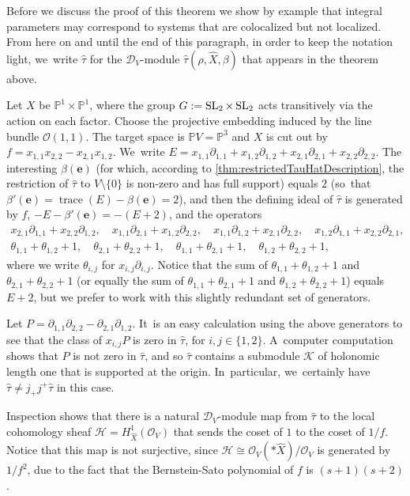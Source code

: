 \documentclass[JEP,XML,SOM,Unicode,published]{cedram}
\let\mathds\mathbb
\newcommand{\bme}{{\boldsymbol{e}}}
\newcommand{\dP}{{\mathds P}}\let\P\dP
\newcommand{\cD}{\mathscr{D}}
\newcommand{\cH}{\mathcal{H}}
\newcommand{\cK}{\mathcal{K}}
\newcommand{\cO}{\mathcal{O}}\let\O\cO
\DeclareMathOperator{\SL}{\textup{SL}}
\DeclareMathOperator{\trace}{trace}
\begin{document}
Before we discuss the proof of this theorem we show by example that integral parameters may correspond to systems that are colocalized but not localized. From here on and until the end of this paragraph, in order to keep the notation light, we~write $\hat\tau$ for the $\cD_V$\nobreakdash-mod\-ule
$\hat{\tau}(\rho, \hat{X}, \beta)$ that appears in the theorem above.

\begin{exa}\label{ex:Coloc}
Let $X$ be $\dP^1\times \dP^1$, where the group $G:=\SL_2\times\SL_2$ acts transitively via the action on each factor. Choose the projective embedding induced by the line bundle $\cO(1,1)$. The target space is $\dP V=\dP^3$ and $X$ is cut out by $f=x_{1,1}x_{2,2}-x_{2,1}x_{1,2}$. We~write
$E=x_{1,1}\partial_{1,1}+x_{1,2}\partial_{1,2}+
x_{2,1}\partial_{2,1}+x_{2,2}\partial_{2,2}$.
The interesting $\beta(\bme)$ (for which, according to \cref{thm:restrictedTauHatDescription}, the restriction of $\hat\tau$ to $V\setminus\{0\}$ is non-zero and has full support) equals $2$
(so~that $\beta'(\bme)=\trace(E)-\beta(\bme)=2$), and then the defining ideal of $\hat \tau$ is generated by $f$, $-E-\beta'(\bme)=-(E+2)$, and the operators
\begin{gather*}
x_{2,1}\partial_{1,1}+x_{2,2}\partial_{1,2},\quad x_{1,1}\partial_{2,1}+x_{1,2}\partial_{2,2},\quad x_{1,1}\partial_{1,2}+x_{2,1}\partial_{2,2},\quad x_{1,2}\partial_{1,1}+x_{2,2}\partial_{2,1},\\
\theta_{1,1}+\theta_{1,2}+1,\quad
\theta_{2,1}+\theta_{2,2}+1,\quad
\theta_{1,1}+\theta_{2,1}+1,\quad
\theta_{1,2}+\theta_{2,2}+1,
\end{gather*}
where we write $\theta_{i,j}$ for $x_{i,j}\partial_{i,j}$. Notice that the sum of $\theta_{1,1}+\theta_{1,2}+1$ and $\theta_{2,1}+\theta_{2,2}+1$ (or equally the sum of $\theta_{1,1}+\theta_{2,1}+1$ and $\theta_{1,2}+\theta_{2,2}+1$) equals $E+2$, but we prefer to work with this slightly redundant set of generators.

Let $P=\partial_{1,1}\partial_{2,2}-\partial_{2,1}\partial_{1,2}$. It~is an easy calculation using the above generators to see that the class of $x_{i,j}P$ is zero in $\hat\tau$, for $i,j\in\{1,2\}$. A~computer computation shows that $P$ is not zero in $\hat\tau$, and so $\hat\tau$ contains a submodule $\cK$ of holonomic length one that is supported at the origin. In~particular, we~certainly have $\hat{\tau}\neq j_+j^+\hat{\tau}$ in this case.

Inspection shows that there is a natural $\cD_V$\nobreakdash-mod\-ule map from $\hat\tau$ to the local cohomology sheaf $\cH=H^1_{\hat X}(\cO_V)$ that sends the coset of $1$ to the coset of $1/f$. Notice that this map is not surjective, since $\cH \cong \cO_V(*\hat{X})/\cO_V$ is generated by $1/f^2$, due to the fact that the Bernstein-Sato polynomial of $f$ is $(s+1)(s+2)$.


\end{exa}
\end{document}

